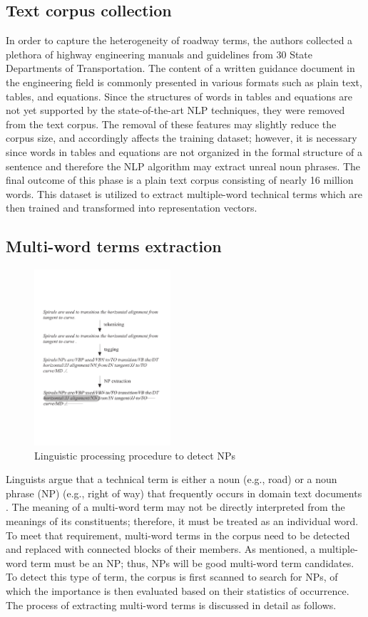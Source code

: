\documentclass[Journal, BackFigs,NoLists, DoubleSpace]{ascelike}%
\begin{document}
\subsection{Text corpus collection}
% 
In order to capture the heterogeneity of roadway terms, the authors collected a plethora of highway engineering manuals and guidelines from 30 State Departments of Transportation. The content of a written guidance document in the engineering field is commonly presented in various formats such as plain text, tables, and equations. Since the structures of words in tables and equations are not yet supported by the state-of-the-art NLP techniques, they were removed from the text corpus. The removal of these features may slightly reduce the corpus size, and accordingly affects the training dataset; however, it is necessary since words in tables and equations are not organized in the formal structure of a sentence and therefore the NLP algorithm may extract unreal noun phrases. The final outcome of this phase is a plain text corpus consisting of nearly 16 million words. This dataset is utilized to extract multiple-word technical terms which are then trained and transformed into representation vectors.
%
\subsection{Multi-word terms extraction}
%
\begin{figure}[t]
	\centering
	\includegraphics[width=0.45\textwidth]{Figure2_NP_extraction}
	\caption{Linguistic processing procedure to detect NPs}
	\label{fig:np_detect}
\end{figure}
%
Linguists argue that a technical term is either a noun (e.g., road) or a noun phrase (NP) (e.g., right of way) that frequently occurs in domain text documents \cite{justeson95}. The meaning of a multi-word term may not be directly interpreted from the meanings of its constituents; therefore, it must be treated as an individual word.  To meet that requirement, multi-word terms in the corpus need to be detected and replaced with connected blocks of their members. As mentioned, a multiple-word term must be an NP; thus, NPs will be good multi-word term candidates. To detect this type of term, the corpus is first scanned to search for NPs, of which the importance is then evaluated based on their statistics of occurrence. The process of extracting multi-word terms is discussed in detail as follows.  %
\end{document}
